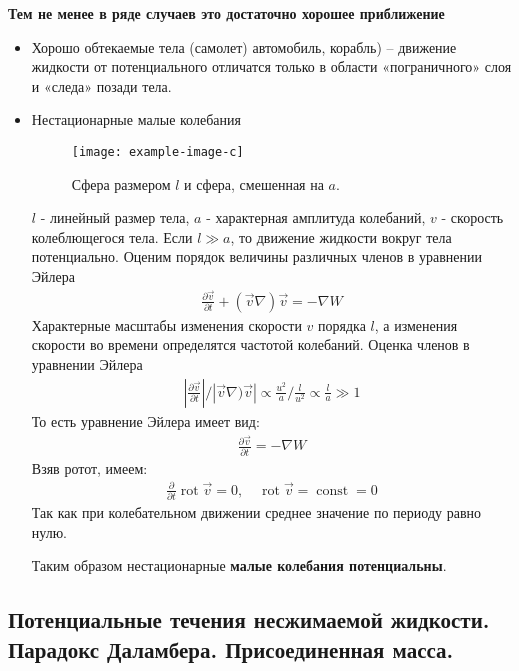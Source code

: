 \begin{enumerate}
	\textbf{Тем не менее в ряде случаев это достаточно хорошее приближение}
	\begin{itemize}
		\item Хорошо обтекаемые тела (самолет) автомобиль, корабль) – движение жидкости от потенциального отличатся только в области «пограничного» слоя и «следа» позади тела.
		\item Нестационарные малые колебания
		\begin{figure}[H]
			\centering
			\texttt{[image: example-image-c]}
			\caption{Сфера размером $l$ и сфера, смешенная на $a$.}
			\label{fig:figure15}
		\end{figure}
		$l$ - линейный размер тела, $a$ - характерная амплитуда колебаний, $v$ - скорость колеблющегося тела. Если $l \gg a$, то движение жидкости вокруг тела потенциально. Оценим порядок величины различных членов в уравнении Эйлера
		\begin{align*}
		\frac { \partial \vec { v } } { \partial t } + ( \vec { v } \nabla ) \vec { v } = - \nabla W
		\end{align*}
		Характерные масштабы изменения скорости $v$ порядка $l$, а изменения скорости во времени определятся частотой колебаний. Оценка членов в уравнении Эйлера
		\begin{align*}
		\left| \frac { \partial \vec { v } } { \partial t } \right| / \left| \vec { v } \nabla ) \vec { v } \right| \propto \frac { u ^ { 2 } } { a } / \frac { l } { u ^ { 2 } } \propto \frac { l } { a } \gg 1
		\end{align*}
		То есть уравнение Эйлера имеет вид:
		\begin{align*}
		\frac { \partial \vec { v } } { \partial t } = - \nabla W
		\end{align*}
		Взяв ротот, имеем:
		\begin{align*}
		\frac { \partial } { \partial t } \operatorname{rot} \vec { v } = 0 , \quad \operatorname { rot } \vec { v } = \operatorname { const } = 0
		\end{align*}
		Так как при колебательном движении среднее значение по периоду равно нулю.

		Таким образом нестационарные \textbf{малые колебания потенциальны}.
	\end{itemize}
\end{enumerate}
\subsection{Потенциальные течения несжимаемой жидкости. Парадокс Даламбера. Присоединенная масса.}


